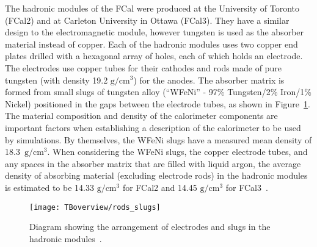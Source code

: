 The hadronic modules of the FCal were produced at the University of Toronto (FCal2) and at Carleton University in Ottawa (FCal3). They have a similar design to the electromagnetic module, however tungsten is used as the absorber material instead of copper. Each of the hadronic modules uses two copper end plates drilled with a hexagonal array of holes, each of which holds an electrode. The electrodes use copper tubes for their cathodes and rods made of pure tungsten (with density 19.2 $\mathrm{g}/\mathrm{cm}^3$) for the anodes. The absorber matrix is formed from small slugs of tungsten alloy (``WFeNi'' - 97\% Tungsten/2\% Iron/1\% Nickel) positioned in the gaps between the electrode tubes, as shown in Figure~\ref{slugfig}. The material composition and density of the calorimeter components are important factors when establishing a description of the calorimeter to be used by simulations. By themselves, the WFeNi slugs have a measured mean density of 18.3~$\mathrm{g}/\mathrm{cm}^3$. When considering the WFeNi slugs, the copper electrode tubes, and any spaces in the absorber matrix that are filled with liquid argon, the average density of absorbing material (excluding electrode rods) in the hadronic modules is estimated to be 14.33 $\mathrm{g}/\mathrm{cm}^3$ for FCal2 and 14.45 $\mathrm{g}/\mathrm{cm}^3$ for FCal3~\cite{Archambault:2009zza}. 

\begin{figure}[tb]
\begin{center}
\texttt{[image: TBoverview/rods\_slugs]}
\end{center}
\caption[Electrode/slug arrangement in the FCal.]{Diagram showing the arrangement of electrodes and slugs in the hadronic modules~\cite{FCal_jinst_2010}.}
\label{slugfig}
\end{figure}









